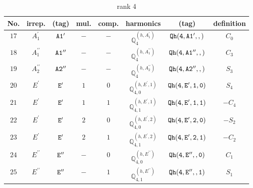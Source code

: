 \documentclass[fleqn,8pt]{jsarticle}
\begin{document}
\begin{table}[ht!]
\begin{center}
\caption{rank 4}
\renewcommand{\arraystretch}{1.3}
\begin{tabular}{cccccccc} \hline \hline
No. & irrep. & (tag) & mul. & comp. & harmonics & (tag) & definition \\ \hline
$ 17 $ & $ A_{1}^{\prime} $ & $ {\tt A1'} $ & $ - $ & $ - $ & $ \mathbb{Q}_{4}^{(h,A_{1}^{\prime})} $ & $ {\tt Qh(4,A1',,)} $ & $ C_{0} $ \\
$ 18 $ & $ A_{1}^{\prime\prime} $ & $ {\tt A1''} $ & $ - $ & $ - $ & $ \mathbb{Q}_{4}^{(h,A_{1}^{\prime\prime})} $ & $ {\tt Qh(4,A1'',,)} $ & $ C_{3} $ \\
$ 19 $ & $ A_{2}^{\prime\prime} $ & $ {\tt A2''} $ & $ - $ & $ - $ & $ \mathbb{Q}_{4}^{(h,A_{2}^{\prime\prime})} $ & $ {\tt Qh(4,A2'',,)} $ & $ S_{3} $ \\
$ 20 $ & $ E^{\prime} $ & $ {\tt E'} $ & $ 1 $ & $ 0 $ & $ \mathbb{Q}_{4,0}^{(h,E^{\prime},1)} $ & $ {\tt Qh(4,E',1,0)} $ & $ S_{4} $ \\
$ 21 $ & $ E^{\prime} $ & $ {\tt E'} $ & $ 1 $ & $ 1 $ & $ \mathbb{Q}_{4,1}^{(h,E^{\prime},1)} $ & $ {\tt Qh(4,E',1,1)} $ & $ - C_{4} $ \\
$ 22 $ & $ E^{\prime} $ & $ {\tt E'} $ & $ 2 $ & $ 0 $ & $ \mathbb{Q}_{4,0}^{(h,E^{\prime},2)} $ & $ {\tt Qh(4,E',2,0)} $ & $ - S_{2} $ \\
$ 23 $ & $ E^{\prime} $ & $ {\tt E'} $ & $ 2 $ & $ 1 $ & $ \mathbb{Q}_{4,1}^{(h,E^{\prime},2)} $ & $ {\tt Qh(4,E',2,1)} $ & $ - C_{2} $ \\
$ 24 $ & $ E^{\prime\prime} $ & $ {\tt E''} $ & $ - $ & $ 0 $ & $ \mathbb{Q}_{4,0}^{(h,E^{\prime\prime})} $ & $ {\tt Qh(4,E'',,0)} $ & $ C_{1} $ \\
$ 25 $ & $ E^{\prime\prime} $ & $ {\tt E''} $ & $ - $ & $ 1 $ & $ \mathbb{Q}_{4,1}^{(h,E^{\prime\prime})} $ & $ {\tt Qh(4,E'',,1)} $ & $ S_{1} $ \\
 \hline \hline
\end{tabular}
\end{center}
\end{table}
\end{document}

